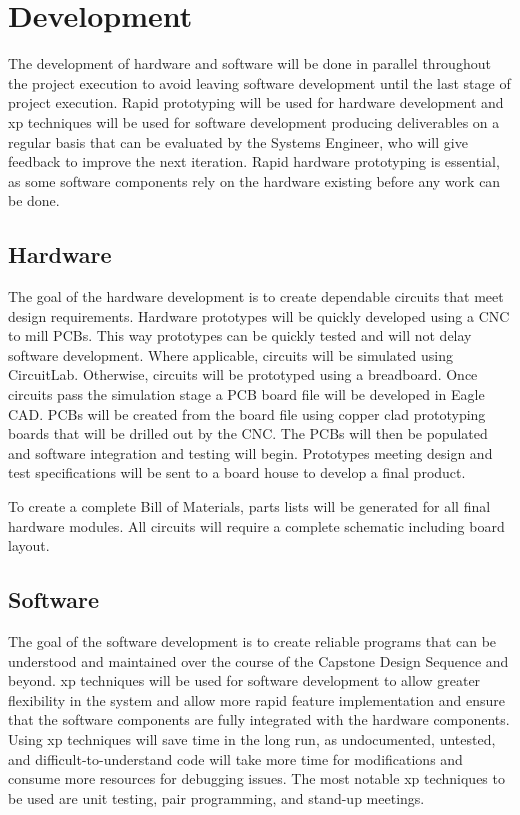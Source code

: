 \chapter{Development}
The development of hardware and software will be done in parallel throughout the project execution to avoid leaving software development until the last stage of project execution. 
Rapid prototyping will be used for hardware development and \gls{xp} techniques will be used for software development producing deliverables on a regular basis that can be evaluated by the Systems Engineer, who will give feedback to improve the next iteration. 
Rapid hardware prototyping is essential, as some software components rely on the hardware existing before any work can be done.
\section{Hardware}
The goal of the hardware development is to create dependable circuits that meet design requirements.
Hardware prototypes will be quickly developed using a CNC to mill PCBs.
This way prototypes can be quickly tested and will not delay software development.
Where applicable, circuits will be simulated using CircuitLab.
Otherwise, circuits will be prototyped using a breadboard.
Once circuits pass the simulation stage a PCB board file will be developed in Eagle CAD.
PCBs will be created from the board file using copper clad prototyping boards that will be drilled out by the CNC.
The PCBs will then be populated and software integration and testing will begin.
Prototypes meeting design and test specifications will be sent to a board house to develop a final product.

To create a complete Bill of Materials, parts lists will be generated for all final hardware modules.
All circuits will require a complete schematic including board layout. 

\section{Software}
The goal of the software development is to create reliable programs that can be understood and maintained over the course of the Capstone Design Sequence and beyond.
\gls{xp} techniques will be used for software development to allow greater flexibility in the system and allow more rapid feature implementation and ensure that the software components are fully integrated with the hardware components. 
Using \gls{xp} techniques will save time in the long run, as undocumented, untested, and difficult-to-understand code will take more time for modifications and consume more resources for debugging issues.
The most notable \gls{xp} techniques to be used are unit testing, pair programming, and stand-up meetings.

